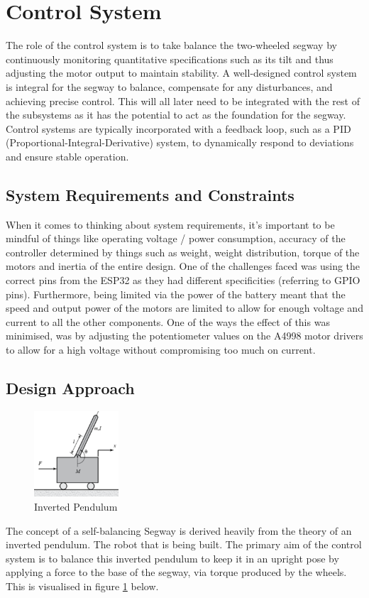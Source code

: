 \section{Control System}

The role of the control system is to take balance the two-wheeled segway by continuously monitoring quantitative specifications such as its tilt and thus adjusting the motor output to maintain stability. A well-designed control system is integral for the segway to balance, compensate for any disturbances, and achieving precise control. This will all later need to be integrated with the rest of the subsystems as it has the potential to act as the foundation for the segway. Control systems are typically incorporated with a feedback loop, such as a PID (Proportional-Integral-Derivative) system, to dynamically respond to deviations and ensure stable operation.

\subsection{System Requirements and Constraints}

When it comes to thinking about system requirements, it’s important to be mindful of things like operating voltage / power consumption, accuracy of the controller determined by things such as weight, weight distribution, torque of the motors and inertia of the entire design.
One of the challenges faced was using the correct pins from the ESP32 as they had different specificities (referring to GPIO pins). Furthermore, being limited via the power of the battery meant that the speed and output power of the motors are limited to allow for enough voltage and current to all the other components. One of the ways the effect of this was minimised, was by adjusting the potentiometer values on the A4998 motor drivers to allow for a high voltage without compromising too much on current. 

\newpage

\subsection{Design Approach}
\begin{figure}
    \centerline{\includegraphics[width=0.28\textwidth]{images/balance.png}}
    \caption{Inverted Pendulum}
    \label{fig:balance}
\end{figure}
The concept of a self-balancing Segway is derived heavily from the theory of an inverted pendulum. The robot that is being built. The primary aim of the control system is to balance this inverted pendulum to keep it in an upright pose by applying a force to the base of the segway, via torque produced by the wheels. This is visualised in figure \ref{fig:balance} below.



